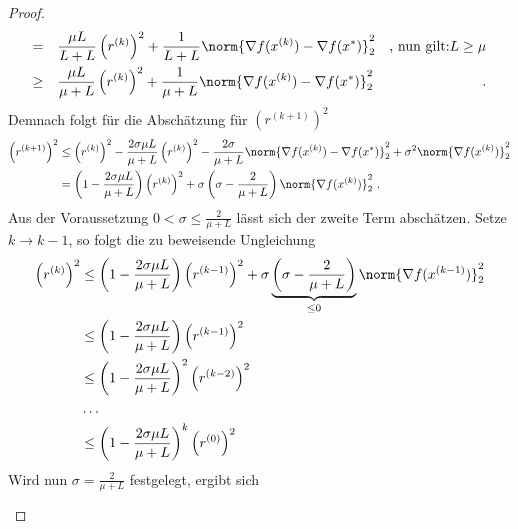 \begin{proof}
\begin{gather*}
\begin{aligned}
              = \quad & \frac{\mu L}{L+L} \left(r^{(k)}\right)^2 + \frac{1}{L+L}\norm{\nabla f(x^{(k)})-\nabla f(x^\ast)}^2_2 & \text{, nun gilt:} L \geq \mu\\
              \geq \quad & \frac{\mu L}{\mu+L} \left(r^{(k)}\right)^2 + \frac{1}{\mu+L}\norm{\nabla f(x^{(k)})-\nabla f(x^\ast)}^2_2 & \text{ .}\\
            \end{aligned}
    \end{gather*}
    Demnach folgt für die Abschätzung für $\left(r^{(k+1)}\right)^2$
    \begin{gather*}
            \begin{aligned}
              \left(r^{(k+1)}\right)^2 & \leq \left(r^{(k)}\right)^2 - \frac{2\sigma \mu L}{\mu+L} \left(r^{(k)}\right)^2 - \frac{2\sigma}{\mu+L}\norm{\nabla f(x^{(k)})-\nabla f(x^\ast)}^2_2 + \sigma^2 \norm{\nabla f(x^{(k)})}^2_2\\
              & = \left( 1 - \frac{2\sigma \mu L}{\mu+L}\right) \left(r^{(k)}\right)^2 + \sigma \left(\sigma - \frac{2}{\mu + L}\right) \norm{\nabla f(x^{(k)})}^2_2 \text{ .} \\
            \end{aligned}
      \end{gather*}
      Aus der Voraussetzung $0<\sigma\leq\frac{2}{\mu + L}$ lässt sich der zweite Term abschätzen. Setze $k\rightarrow k-1$, so folgt die zu beweisende Ungleichung
      \begin{gather*}
              \begin{aligned}
                \left(r^{(k)}\right)^2 & \leq \left( 1 - \frac{2\sigma \mu L}{\mu+L}\right) \left(r^{(k-1)}\right)^2 + \sigma \underbrace{\left(\sigma - \frac{2}{\mu + L}\right)}_{\leq 0} \norm{\nabla f(x^{(k-1)})}^2_2 \\
                & \leq \left( 1 - \frac{2\sigma \mu L}{\mu+L}\right) \left(r^{(k-1)}\right)^2 \\
                & \leq \left( 1 - \frac{2\sigma \mu L}{\mu+L}\right)^2 \left(r^{(k-2)}\right)^2 \\
                & \dots \\
                & \leq \bigg(1 - \frac{2\sigma \mu L}{\mu+L}\bigg)^k \left(r^{(0)}\right)^2
              \end{aligned}
        \end{gather*}
      Wird nun $\sigma = \frac{2}{\mu + L}$ festgelegt, ergibt sich
      \begin{gather*}
              \begin{aligned}

\end{aligned}
\end{gather*}
\end{proof}
